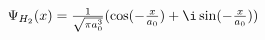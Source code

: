 \documentclass[preview]{standalone}
\begin{document}
\begin{center}
$\Psi_{H_2}(x) = \frac{1}{\sqrt{\pi a_0^3}}(\cos(-\frac{x}{a_0})+\i\sin(-\frac{x}{a_0})) $
\end{center}
\end{document}
